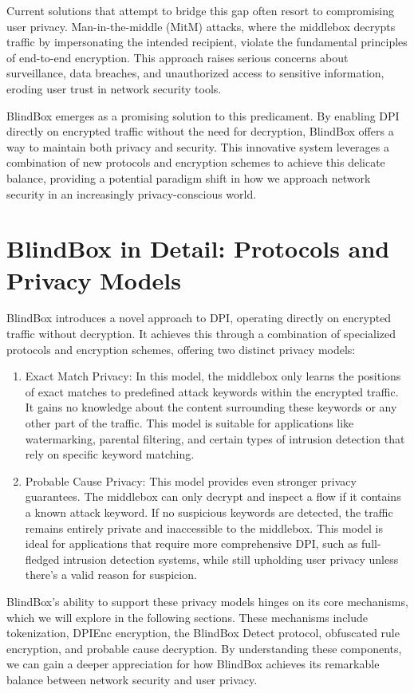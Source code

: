 \documentclass[conference]{IEEEtran}
\begin{document}
Current solutions that attempt to bridge this gap often resort to compromising user privacy. Man-in-the-middle (MitM) attacks, where the middlebox decrypts traffic by impersonating the intended recipient, violate the fundamental principles of end-to-end encryption. This approach raises serious concerns about surveillance, data breaches, and unauthorized access to sensitive information, eroding user trust in network security tools.

BlindBox emerges as a promising solution to this predicament. By enabling DPI directly on encrypted traffic without the need for decryption, BlindBox offers a way to maintain both privacy and security. This innovative system leverages a combination of new protocols and encryption schemes to achieve this delicate balance, providing a potential paradigm shift in how we approach network security in an increasingly privacy-conscious world.

\section{BlindBox in Detail: Protocols and Privacy Models}

BlindBox introduces a novel approach to DPI, operating directly on encrypted traffic without decryption. It achieves this through a combination of specialized protocols and encryption schemes, offering two distinct privacy models:
\begin{enumerate}
    \item Exact Match Privacy: In this model, the middlebox only learns the positions of exact matches to predefined attack keywords within the encrypted traffic. It gains no knowledge about the content surrounding these keywords or any other part of the traffic. This model is suitable for applications like watermarking, parental filtering, and certain types of intrusion detection that rely on specific keyword matching.

    \item Probable Cause Privacy: This model provides even stronger privacy guarantees. The middlebox can only decrypt and inspect a flow if it contains a known attack keyword. If no suspicious keywords are detected, the traffic remains entirely private and inaccessible to the middlebox. This model is ideal for applications that require more comprehensive DPI, such as full-fledged intrusion detection systems, while still upholding user privacy unless there's a valid reason for suspicion.
\end{enumerate}
BlindBox's ability to support these privacy models hinges on its core mechanisms, which we will explore in the following sections. These mechanisms include tokenization, DPIEnc encryption, the BlindBox Detect protocol, obfuscated rule encryption, and probable cause decryption. By understanding these components, we can gain a deeper appreciation for how BlindBox achieves its remarkable balance between network security and user privacy.
\end{document}
